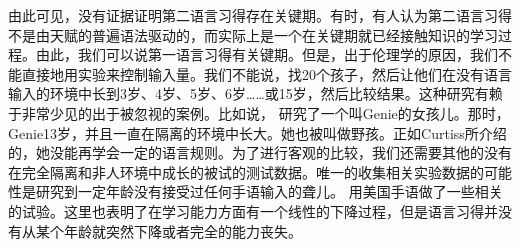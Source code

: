 由此可见，没有证据证明第二语言习得存在关键期。有时，有人认为第二语言习得不是由天赋的普遍语法驱动的，而实际上是一个在关键期就已经接触知识的学习过程\citep[]{Lenneberg67a-u}。由此，我们可以说第一语言习得有关键期。但是，出于伦理学的原因，我们不能直接地用实验来控制输入量。我们不能说，找20个孩子，然后让他们在没有语言输入的环境中长到3岁、4岁、5岁、6岁……或15岁，然后比较结果。这种研究有赖于非常少见的出于被忽视的案例。比如说， \citet{Curtiss77a-u}研究了一个叫Genie的女孩儿。那时，Genie13岁，并且一直在隔离的环境中长大。她也被叫做野孩。正如Curtiss所介绍的，她没能再学会一定的语言规则。为了进行客观的比较，我们还需要其他的没有在完全隔离和非人环境中成长的被试的测试数据。唯一的收集相关实验数据的可能性是研究到一定年龄没有接受过任何手语输入的聋儿。 \citet[]{JN89a}用美国手语做了一些相关的试验。这里也表明了在学习能力方面有一个线性的下降过程，但是语言习得并没有从某个年龄就突然下降或者完全的能力丧失。

